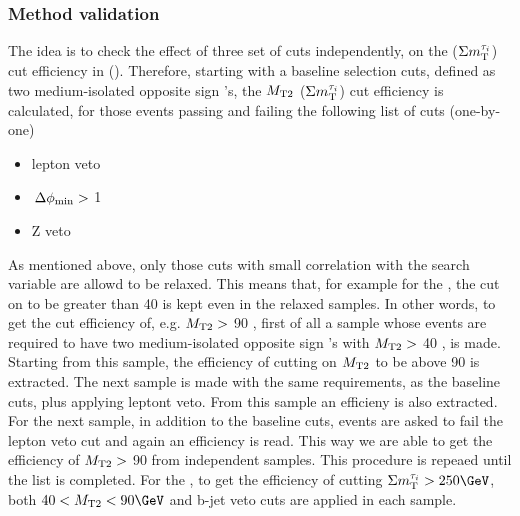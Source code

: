\subsubsection{Method validation}
The idea is to check the effect of three set of cuts independently, 
on the \mttwo ($\Sigma m_{\rm T}^{\tau_i}$) cut efficiency in  \binone (\bintwo). 
Therefore, starting with a baseline selection cuts, defined as two 
medium-isolated opposite sign \Tau's, the ${M_{\rm T2}}$ ($\Sigma m_{\rm T}^{\tau_i}$) cut 
efficiency is calculated, for those events passing and failing the following list of cuts (one-by-one)
\begin{itemize}
\item lepton veto
\item $\,{\Delta\phi_{\rm min}}>$ 1
\item Z veto 
\end{itemize}
As mentioned above, only those cuts with small correlation with the search variable are allowd to be relaxed. This 
means that, for example for the \binone, the cut on \mttwo to be greater than 40 \GeV is kept even in the relaxed samples. 
In other words, to get the cut efficiency of, e.g. ${M_{\rm T2}}>$ 90 \GeV, first of all a sample whose events are required 
to have two medium-isolated opposite sign \Tau's with ${M_{\rm T2}}>$ 40 \GeV, is made. Starting from this sample, the efficiency of 
cutting on ${M_{\rm T2}}$ to be above 90 \GeV is extracted. The next sample is made with the same requirements, as the baseline cuts, 
plus applying leptont veto. From this sample an efficieny is also extracted. For the next sample, in addition to the baseline 
cuts, events are asked to fail the lepton veto cut and again an efficiency is read. This way we are able to get the efficiency 
of ${M_{\rm T2}}>$ 90 \GeV from independent samples. This procedure is repeaed until the list is completed. For the \bintwo, 
 to get the efficiency of cutting $\SumMT>250\GeV$, both $40 < \mttwo < 90 \GeV$ and b-jet veto cuts are applied in each sample.
            
